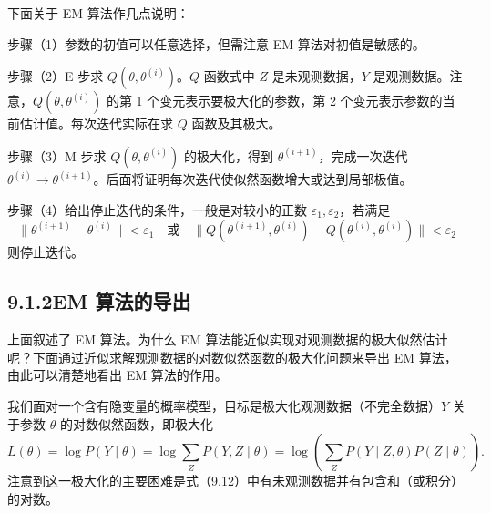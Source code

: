 \documentclass[UTF8,12pt,a4paper,fontset=fandol]{ctexart}
\begin{document}
下面关于 EM 算法作几点说明：

步骤（1）参数的初值可以任意选择，但需注意 EM 算法对初值是敏感的。

步骤（2）E 步求 $Q(\theta,\theta^{(i)})$。$Q$ 函数式中 $Z$ 是未观测数据，$Y$ 是观测数据。注意，$Q(\theta,\theta^{(i)})$ 的第 1 个变元表示要极大化的参数，第 2 个变元表示参数的当前估计值。每次迭代实际在求 $Q$ 函数及其极大。

步骤（3）M 步求 $Q(\theta,\theta^{(i)})$ 的极大化，得到 $\theta^{(i+1)}$，完成一次迭代 $\theta^{(i)}\to\theta^{(i+1)}$。后面将证明每次迭代使似然函数增大或达到局部极值。

步骤（4）给出停止迭代的条件，一般是对较小的正数 $\varepsilon_1,\varepsilon_2$，若满足
\[
  \|\theta^{(i+1)}-\theta^{(i)}\|<\varepsilon_1
  \quad\text{或}\quad
  \|Q(\theta^{(i+1)},\theta^{(i)})-Q(\theta^{(i)},\theta^{(i)})\|<\varepsilon_2
\]
则停止迭代。

\subsection*{9.1.2\quad EM 算法的导出}

上面叙述了 EM 算法。为什么 EM 算法能近似实现对观测数据的极大似然估计呢？下面通过近似求解观测数据的对数似然函数的极大化问题来导出 EM 算法，由此可以清楚地看出 EM 算法的作用。

我们面对一个含有隐变量的概率模型，目标是极大化观测数据（不完全数据）$Y$ 关于参数 $\theta$ 的对数似然函数，即极大化
\begin{equation}
  L(\theta)=\log P(Y\mid\theta)=\log\sum_Z P(Y,Z\mid\theta)
  =\log\left(\sum_Z P(Y\mid Z,\theta)P(Z\mid\theta)\right).
  \tag{9.12}
\end{equation}
注意到这一极大化的主要困难是式（9.12）中有未观测数据并有包含和（或积分）的对数。
\end{document}
